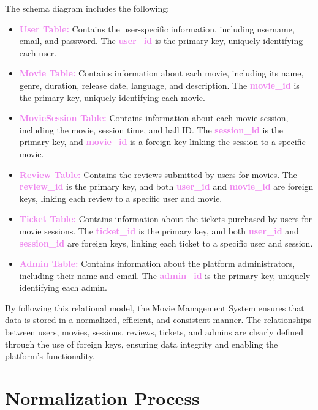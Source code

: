 \documentclass[a4paper,12pt]{article}  %
\renewcommand{\textbf}[1]{\textcolor{violet}{\bfseries #1}}
\begin{document}
The schema diagram includes the following:

\begin{itemize}
    \item \textbf{User Table:} Contains the user-specific information, including username, email, and password. The \textbf{user\_id} is the primary key, uniquely identifying each user.
    \item \textbf{Movie Table:} Contains information about each movie, including its name, genre, duration, release date, language, and description. The \textbf{movie\_id} is the primary key, uniquely identifying each movie.
    \item \textbf{MovieSession Table:} Contains information about each movie session, including the movie, session time, and hall ID. The \textbf{session\_id} is the primary key, and \textbf{movie\_id} is a foreign key linking the session to a specific movie.
    \item \textbf{Review Table:} Contains the reviews submitted by users for movies. The \textbf{review\_id} is the primary key, and both \textbf{user\_id} and \textbf{movie\_id} are foreign keys, linking each review to a specific user and movie.
    \item \textbf{Ticket Table:} Contains information about the tickets purchased by users for movie sessions. The \textbf{ticket\_id} is the primary key, and both \textbf{user\_id} and \textbf{session\_id} are foreign keys, linking each ticket to a specific user and session.
    \item \textbf{Admin Table:} Contains information about the platform administrators, including their name and email. The \textbf{admin\_id} is the primary key, uniquely identifying each admin.
\end{itemize}

By following this relational model, the Movie Management System ensures that data is stored in a normalized, efficient, and consistent manner. The relationships between users, movies, sessions, reviews, tickets, and admins are clearly defined through the use of foreign keys, ensuring data integrity and enabling the platform's functionality.





\clearpage



\section{Normalization Process}
\end{document}
